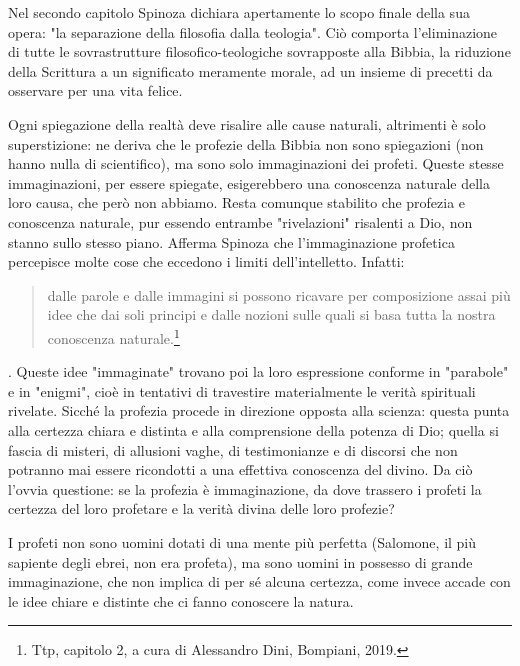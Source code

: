 Nel secondo capitolo Spinoza dichiara apertamente lo scopo finale della sua opera: "la separazione della filosofia dalla teologia". Ciò comporta l'eliminazione di tutte le sovrastrutture filosofico-teologiche sovrapposte alla Bibbia, la riduzione della
Scrittura a un significato meramente morale, ad un insieme di precetti da osservare per una vita felice.

Ogni spiegazione della realtà deve risalire alle cause naturali, altrimenti
è solo superstizione: ne deriva che le profezie della Bibbia non
sono spiegazioni (non hanno nulla di scientifico), ma sono solo immaginazioni dei profeti. Queste
stesse immaginazioni, per essere spiegate, esigerebbero una conoscenza naturale della loro causa,
che però non abbiamo. Resta comunque stabilito che profezia e conoscenza naturale, pur essendo
entrambe "rivelazioni" risalenti a Dio, non stanno sullo
stesso piano. Afferma Spinoza che l'immaginazione profetica percepisce
molte cose che eccedono i limiti dell'intelletto. Infatti: 

\begin{quotation}
	\small dalle parole e dalle immagini si possono
	ricavare per composizione assai più idee che dai soli principi e dalle nozioni sulle quali si basa tutta
	la nostra conoscenza naturale.\footnote{Ttp, capitolo 2, a cura di Alessandro Dini, Bompiani, 2019.}
\end{quotation}

. Queste idee "immaginate" trovano poi la loro espressione
conforme in "parabole" e in "enigmi", cioè in tentativi di travestire materialmente le verità spirituali
rivelate. Sicché la profezia procede in direzione opposta alla scienza: questa punta alla
certezza chiara e distinta e alla comprensione della potenza di Dio; quella si fascia di misteri, di allusioni vaghe, di testimonianze e di discorsi che non potranno
mai essere ricondotti a una effettiva conoscenza del divino. Da ciò l'ovvia questione: se
la profezia è immaginazione,
da dove trassero i profeti la certezza del loro profetare e la verità divina
delle loro profezie?



I profeti non sono uomini dotati di una mente più perfetta
(Salomone, il più sapiente degli ebrei, non era profeta), ma sono uomini in possesso di grande immaginazione, che non implica di per sé alcuna certezza, come invece accade con le idee chiare e
distinte che ci fanno conoscere la natura.

